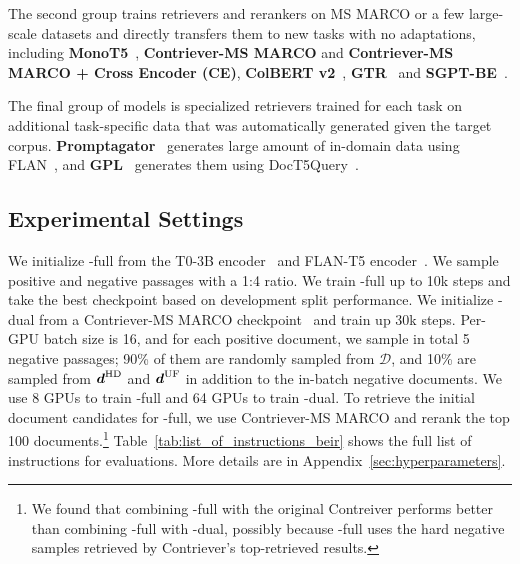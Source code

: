 The second group trains retrievers and rerankers on MS MARCO or a few large-scale datasets and directly transfers them to new tasks with no adaptations, including {\bf MonoT5}~\cite{nogueira-etal-2020-document}, {\bf Contriever-MS MARCO} and {\bf Contriever-MS MARCO + Cross Encoder (CE)}, {\bf ColBERT v2}~\cite{santhanam-etal-2022-colbertv2}, {\bf GTR}~\cite{ni2021large} and {\bf SGPT-BE}~\cite{muennighoff2022sgpt}. 

The final group of models is specialized retrievers trained for each task on additional task-specific data that was automatically generated given the target corpus. 
{\bf Promptagator}~\cite{promptagator} generates large amount of in-domain data using FLAN~\cite{wei2022finetuned}, and {\bf GPL}~\cite{wang-etal-2022-gpl} generates them using DocT5Query~\cite{doc2query}. 

\subsection{Experimental Settings}
We initialize \model-full from the T0-3B encoder~\cite{sanh2022multitask} {and FLAN-T5 encoder~\cite{flan_palm}}. We sample positive and negative passages with a 1:4 ratio. 
We train \model-full up to 10k steps and take the best checkpoint based on development split performance. 
We initialize \model-dual from a Contriever-MS MARCO checkpoint~\cite{izacard2022unsupervised} and train up 30k steps. 
Per-GPU batch size is 16, and for each positive document, we sample in total 5 negative passages; 90\% of them are randomly sampled from $\mathcal{D}$, and 10\% are sampled from $\boldsymbol{d}^{\rm HD}$ and $\boldsymbol{d}^{\rm UF}$ in addition to the in-batch negative documents. 
We use 8 GPUs to train \model-full and 64 GPUs to train \model-dual.
To retrieve the initial document candidates for \model-full, we use Contriever-MS MARCO and rerank the top 100 documents.\footnote{We found that combining \model-full with the original Contreiver performs better than combining \model-full with \model-dual, possibly because \model-full uses the hard negative samples retrieved by Contriever's top-retrieved results. }
{Table~\ref{tab:list_of_instructions_beir} shows the full list of instructions for evaluations}. 
More details are in Appendix~\ref{sec:hyperparameters}. 
